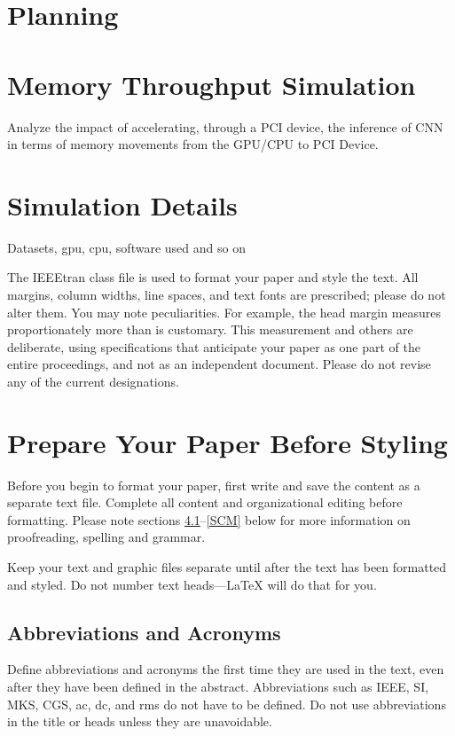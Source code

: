 \documentclass[conference]{IEEEtran}
\begin{document}
\section{Planning}

\section{Memory Throughput Simulation}
Analyze the impact of accelerating, through a PCI device, the inference of CNN in terms of memory movements from the GPU/CPU to PCI Device.


\section{Simulation Details}
Datasets, gpu, cpu, software used and so on

The IEEEtran class file is used to format your paper and style the text. All margins, 
column widths, line spaces, and text fonts are prescribed; please do not 
alter them. You may note peculiarities. For example, the head margin
measures proportionately more than is customary. This measurement 
and others are deliberate, using specifications that anticipate your paper 
as one part of the entire proceedings, and not as an independent document. 
Please do not revise any of the current designations.

\section{Prepare Your Paper Before Styling}
Before you begin to format your paper, first write and save the content as a 
separate text file. Complete all content and organizational editing before 
formatting. Please note sections \ref{AA}--\ref{SCM} below for more information on 
proofreading, spelling and grammar.

Keep your text and graphic files separate until after the text has been 
formatted and styled. Do not number text heads---{\LaTeX} will do that 
for you.

\subsection{Abbreviations and Acronyms}\label{AA}
Define abbreviations and acronyms the first time they are used in the text, 
even after they have been defined in the abstract. Abbreviations such as 
IEEE, SI, MKS, CGS, ac, dc, and rms do not have to be defined. Do not use 
abbreviations in the title or heads unless they are unavoidable.
\end{document}
